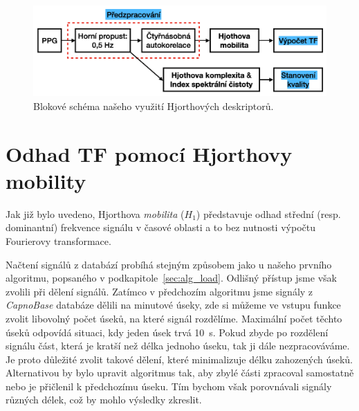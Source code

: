 \begin{figure}[h]
	\centering
	\includegraphics[width=1\textwidth]{./obrazky/hjorth_schema.png} %
	\caption[Schéma našeho algorimu, který využívá Hjorthových deskriptorů]{Blokové schéma našeho využití Hjorthových deskriptorů.}
	\label{fig:hjorth_schemata}
\end{figure}

\section{Odhad TF pomocí Hjorthovy mobility}
\label{sec:hjorth_mobilita_tf}
Jak již bylo uvedeno, Hjorthova \textit{mobilita} (\( H_1 \)) představuje odhad střední (resp. dominantní) frekvence signálu v časové oblasti a to bez nutnosti výpočtu Fourierovy transformace.

Načtení signálů z databází probíhá stejným způsobem jako u našeho prvního algoritmu, popsaného v podkapitole~\ref{sec:alg_load}.
Odlišný přístup jsme však zvolili při dělení signálů.
Zatímco v předchozím algoritmu jsme signály z \textit{CapnoBase} databáze dělili na minutové úseky, zde si můžeme ve vstupu funkce zvolit libovolný počet úseků, na které signál rozdělíme.
Maximální počet těchto úseků odpovídá situaci, kdy jeden úsek trvá 10~s.
Pokud zbyde po rozdělení signálu část, která je kratší než délka jednoho úseku, tak ji dále nezpracováváme.
Je proto důležité zvolit takové dělení, které minimalizuje délku zahozených úseků.
Alternativou by bylo upravit algoritmus tak, aby zbylé části zpracoval samostatně nebo je přičlenil k předchozímu úseku.
Tím bychom však porovnávali signály různých délek, což by mohlo výsledky zkreslit.

